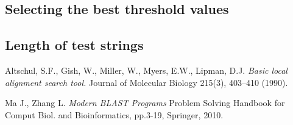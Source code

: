 \documentclass[12pt]{article}%
\begin{document}
\subsection{Selecting the best threshold values}

\subsection{Length of test strings}


\begin{thebibliography}{9}

Altschul, S.F., Gish, W., Miller, W., Myers, E.W., Lipman, D.J. 
\emph{Basic local alignment search tool. }
Journal of Molecular Biology 215(3), 403–410 (1990).

Ma J., Zhang L.
\emph{Modern BLAST Programs}
Problem Solving Handbook for Comput Biol. and Bioinformatics, pp.3-19, Springer, 2010.


\end{thebibliography}
\end{document}
